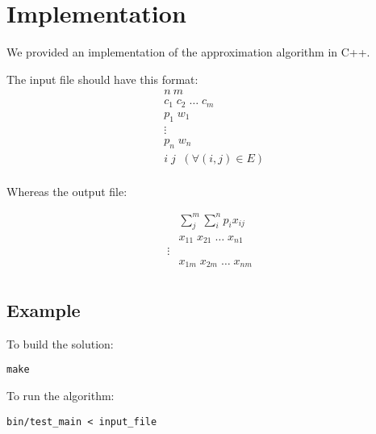 \documentclass[]{article}
\begin{document}
\section{Implementation}
We provided an implementation of the approximation algorithm in C++. 

The input file should have this format:
\begin{align*}
&n\ m								    \\
&c_1 \; c_2 \; \dots \; c_m			    \\
&p_1 \; w_1							    \\
& \vdots							    \\
&p_n \; w_n							    \\
& i \; j \; \;	(\forall (i,j)\in E)	\\
\end{align*}

Whereas the output file:

\begin{align*}
&\sum_j^m \sum_i^n p_i x_{ij}			\\
&x_{11} \; x_{21} \; \dots \; x_{n1}    \\
\vdots									\\
&x_{1m} \; x_{2m} \; \dots \; x_{nm}    \\
\end{align*}

\subsection{Example}

To build the solution:
\begin{verbatim}
make
\end{verbatim}

To run the algorithm:
\begin{verbatim}
bin/test_main < input_file
\end{verbatim}


\printbibliography
\end{document}
